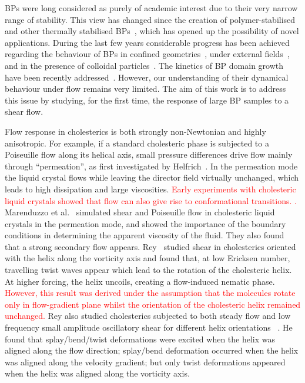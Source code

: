\documentclass[8.5pt,twoside,twocolumn]{article}
\newcommand{\rev}[1]{{\textcolor{red}{#1}}}
\begin{document}
BPs were long considered as purely of academic interest due to their very narrow 
range of stability. This view has changed since the creation of polymer-stabilised and other thermally 
stabilised BPs~\cite{Kikuchi:2002,Coles:2005}, which has opened up the 
possibility of novel applications.
During the last few years considerable progress has been achieved regarding the behaviour 
of BPs in confined geometries~\cite{Fukuda:2010a, Fukuda:2010b, Ravnik:2011b}, under 
external fields~\cite{Alexander:2008,Fukuda:2009,Henrich:2010a,Castles:2010,Tiribocchi:2011a}, 
and in the presence of colloidal particles~\cite{Ravnik:2011a}.
The kinetics of BP domain growth have been recently addressed~\cite{Henrich:2010b}. 
However, our understanding of their dynamical behaviour under flow remains
very limited. The aim of this work is to address this issue by studying,
for the first time, the response of large BP samples to a shear flow.

Flow response in cholesterics is both strongly non-Newtonian and highly anisotropic.
For example, if a standard cholesteric phase is subjected to a Poiseuille flow along
its helical axis, small pressure differences drive flow mainly through
``permeation'', as first investigated by Helfrich~\cite{Helfrich:1969}.
In the permeation mode the liquid crystal flows while leaving the director
field virtually unchanged, which leads to high dissipation and large
viscosities. \rev{
Early experiments with cholesteric liquid crystals
showed that flow can also give rise to conformational transitions. \cite{Press:1978}.
}
Marenduzzo et al.~\cite{Marenduzzo:2006a,Marenduzzo:2006b} simulated 
shear and Poiseuille flow in cholesteric liquid crystals in the permeation mode, and 
showed the importance of the boundary conditions in determining the apparent viscosity of the fluid. 
They also found that a strong secondary flow appears.
Rey~\cite{Rey:1996a, Rey:1996b} studied shear in cholesterics oriented with the helix along 
the vorticity axis and found that, at low Ericksen number, travelling twist waves appear which 
lead to the rotation of the cholesteric helix. At higher forcing, the helix uncoils, creating a flow-induced nematic phase. 
\rev{
However, this result was derived under the 
assumption that the molecules rotate only in flow-gradient plane whilst
the orientation of the cholesteric helix remained unchanged.
}  
Rey also studied cholesterics subjected to both steady flow and low frequency
small amplitude oscillatory shear for different helix orientations
~\cite{Rey:2000, Rey:2002}. He found that splay/bend/twist deformations were
excited when the helix was aligned along the flow direction; splay/bend
deformation occurred when the helix was aligned along the velocity gradient;
but only twist deformations
appeared when the helix was aligned along the vorticity axis.
\end{document}
